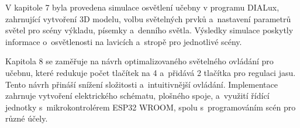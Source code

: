 V kapitole 7 byla provedena simulace osvětlení učebny v programu DIALux,
zahrnující vytvoření 3D modelu, volbu světelných prvků a~nastavení parametrů
světel pro scény výkladu, písemky a~denního světla.
Výsledky simulace poskytly informace o~osvětlenosti na lavicích a~stropě pro jednotlivé scény.

Kapitola 8 se zaměřuje na návrh optimalizovaného světelného ovládání pro učebnu,
které redukuje počet tlačítek na 4 a~přidává 2 tlačítka pro regulaci jasu.
Tento návrh přináší snížení složitosti a~intuitivnější ovládání.
Implementace zahrnuje vytvoření elektrického schématu, plošného spoje, a~využití
řídící jednotky s~mikrokontrolérem ESP32 WROOM, spolu s~programováním scén pro různé účely.







